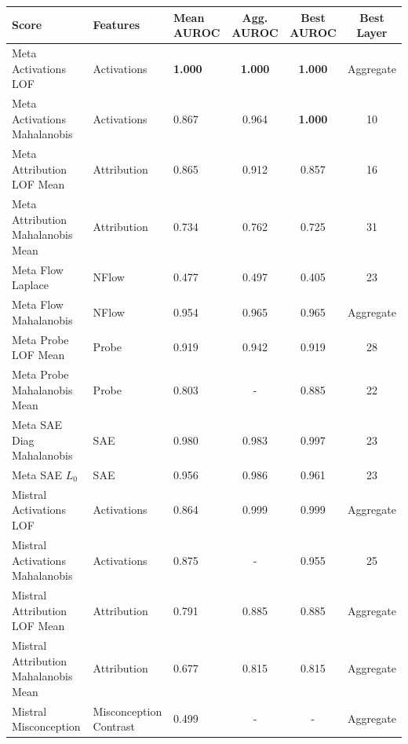 \begin{table}[H]
\centering
\scriptsize  %
\renewcommand{\arraystretch}{1.2}  %
\setlength{\tabcolsep}{2pt}  %
\begin{tabular}{lp{3cm}lccc}
\toprule
\textbf{Score} & \textbf{Features} & \textbf{Mean AUROC} & \textbf{Agg. AUROC} & \textbf{Best AUROC} & \textbf{Best Layer} \\
\midrule
Meta Activations LOF                 & Activations            & \textbf{1.000}  & \textbf{1.000}  & \textbf{1.000}  & Aggregate \\ 
Meta Activations Mahalanobis         & Activations            & 0.867  & 0.964  & \textbf{1.000}  & 10 \\ 
Meta Attribution LOF Mean            & Attribution            & 0.865  & 0.912  & 0.857  & 16 \\ 
Meta Attribution Mahalanobis Mean    & Attribution            & 0.734  & 0.762  & 0.725  & 31 \\ 
Meta Flow Laplace                    & NFlow                  & 0.477  & 0.497  & 0.405  & 23 \\ 
Meta Flow Mahalanobis                & NFlow                  & 0.954  & 0.965  & 0.965  & Aggregate \\ 
Meta Probe LOF Mean                  & Probe                  & 0.919  & 0.942  & 0.919  & 28 \\ 
Meta Probe Mahalanobis Mean          & Probe                  & 0.803  & -      & 0.885  & 22 \\ 
Meta SAE Diag Mahalanobis            & SAE                    & 0.980  & 0.983  & 0.997  & 23 \\ 
Meta SAE $L_0$                          & SAE                    & 0.956  & 0.986  & 0.961  & 23 \\ 
Mistral Activations LOF              & Activations            & 0.864  & 0.999  & 0.999  & Aggregate \\ 
Mistral Activations Mahalanobis      & Activations            & 0.875  & -      & 0.955  & 25 \\ 
Mistral Attribution LOF Mean         & Attribution            & 0.791  & 0.885  & 0.885  & Aggregate \\ 
Mistral Attribution Mahalanobis Mean & Attribution            & 0.677  & 0.815  & 0.815  & Aggregate \\ 
Mistral Misconception                & Misconception Contrast & 0.499  & -      & -      & Aggregate \\ 

\end{tabular}
\end{table}
